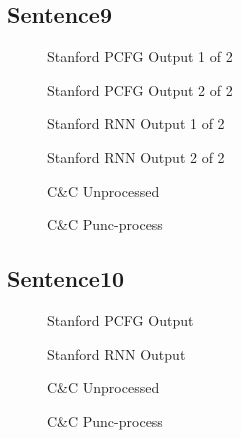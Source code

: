 \documentclass{article}
\begin{document}
\begin{landscape}
\section{Sentence9}
\begin{figure}[!h]
    \center{%
        \resizebox{1.2\textwidth}{!}{}
    }
    \caption{Stanford PCFG Output 1 of 2}
\end{figure}
\begin{figure}[!h]
    \center{%
        \resizebox{0.8\textwidth}{!}{}
    }
    \caption{Stanford PCFG Output 2 of 2}
\end{figure}
\begin{figure}[!h]
    \center{%
        \resizebox{1.2\textwidth}{!}{}
    }
    \caption{Stanford RNN Output 1 of 2}
\end{figure}
\begin{figure}[!h]
    \center{%
        \resizebox{0.8\textwidth}{!}{}
    }
    \caption{Stanford RNN Output 2 of 2}
\end{figure}

\pagebreak
\begin{figure}[!h]
    \center{%
        \resizebox{1.2\textwidth}{!}{}
    }
	\caption{C\&C Unprocessed}
\end{figure}

\begin{figure}[!h]
    \center{%
        \resizebox{1.2\textwidth}{!}{}
    }
	\caption{C\&C Punc-process}
\end{figure}
\end{landscape}
\pagebreak

\begin{landscape}
\section{Sentence10}
\begin{figure}[!h]
    \center{%
        \resizebox{1.2\textwidth}{!}{}
    }
    \caption{Stanford PCFG Output}
\end{figure}

\begin{figure}[!h]
    \center{%
        \resizebox{1.2\textwidth}{!}{}
    }
    \caption{Stanford RNN Output}
\end{figure}

\pagebreak
\begin{figure}[!h]
    \center{%
        \resizebox{1.2\textwidth}{!}{}
    }
	\caption{C\&C Unprocessed}
\end{figure}

\begin{figure}[!h]
    \center{%
        \resizebox{1.2\textwidth}{!}{}
    }
	\caption{C\&C Punc-process}
\end{figure}
\end{landscape}
\pagebreak
\end{document}
